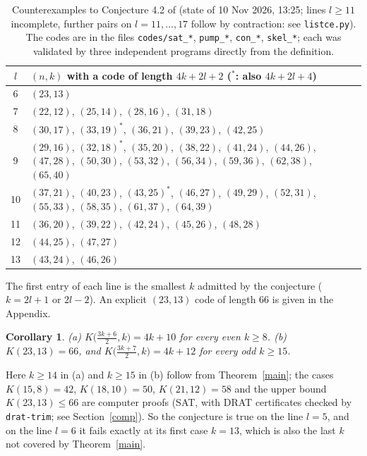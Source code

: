 \documentclass[11pt]{article}
\newtheorem{corollary}{Corollary}
\theoremstyle{remark}
\begin{document}
\begin{table}[h]\centering
\begin{tabular}{cp{}}\toprule
$l$ & $(n,k)$ with a code of length $4k+2l+2$ \quad($^*$: also $4k+2l+4$) \\ \midrule
6 & $(23,13)$ \\
7 & $(22,12)$, $(25,14)$, $(28,16)$, $(31,18)$ \\
8 & $(30,17)$, $(33,19)^*$, $(36,21)$, $(39,23)$, $(42,25)$ \\
9 & $(29,16)$, $(32,18)^*$, $(35,20)$, $(38,22)$, $(41,24)$, $(44,26)$, $(47,28)$, $(50,30)$, $(53,32)$, $(56,34)$, $(59,36)$, $(62,38)$, $(65,40)$ \\
10 & $(37,21)$, $(40,23)$, $(43,25)^*$, $(46,27)$, $(49,29)$, $(52,31)$, $(55,33)$, $(58,35)$, $(61,37)$, $(64,39)$ \\
11 & $(36,20)$, $(39,22)$, $(42,24)$, $(45,26)$, $(48,28)$ \\
12 & $(44,25)$, $(47,27)$ \\
13 & $(43,24)$, $(46,26)$ \\ \bottomrule
\end{tabular}
\caption{Counterexamples to Conjecture 4.2 of \cite{B2} (state of 10 Nov 2026, 13:25; lines $l\ge 11$ incomplete, further pairs on $l=11,\dots,17$ follow by contraction: see \texttt{listce.py}). The codes are in the files
\texttt{codes/sat\_*}, \texttt{pump\_*}, \texttt{con\_*}, \texttt{skel\_*};
each was validated by three independent programs directly from the definition.}\label{tab}
\end{table}

The first entry of each line is the smallest $k$ admitted by the conjecture ($k=2l+1$ or $2l-2$). An explicit
$(23,13)$ code of length $66$ is given in the Appendix.

\begin{corollary}\label{lines}
(a) $K\bigl(\tfrac{3k+6}{2},k\bigr)=4k+10$ for every even $k\ge 8$.\quad
(b) $K(23,13)=66$, and $K\bigl(\tfrac{3k+7}{2},k\bigr)=4k+12$ for every odd $k\ge 15$.
\end{corollary}
Here $k\ge 14$ in (a) and $k\ge 15$ in (b) follow from Theorem~\ref{main}; the cases $K(15,8)=42$, $K(18,10)=50$, $K(21,12)=58$
and the upper bound $K(23,13)\le 66$ are computer proofs (SAT, with DRAT certificates checked by \texttt{drat-trim}; see Section~\ref{comp}). So the conjecture is true on the line $l=5$,
and on the line $l=6$ it fails exactly at its first case $k=13$, which is also the last $k$ not covered by Theorem~\ref{main}.
\end{document}
